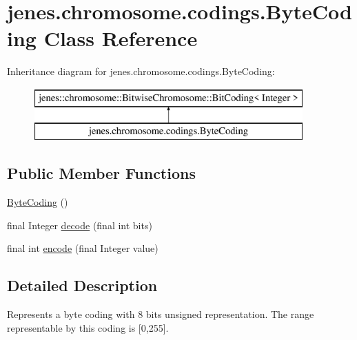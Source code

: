 \hypertarget{classjenes_1_1chromosome_1_1codings_1_1_byte_coding}{\section{jenes.\-chromosome.\-codings.\-Byte\-Coding Class Reference}
\label{classjenes_1_1chromosome_1_1codings_1_1_byte_coding}
}
Inheritance diagram for jenes.\-chromosome.\-codings.\-Byte\-Coding\-:\begin{figure}[H]
\begin{center}
\leavevmode
\includegraphics[height=2.000000cm]{classjenes_1_1chromosome_1_1codings_1_1_byte_coding}
\end{center}
\end{figure}
\subsection*{Public Member Functions}
\begin{DoxyCompactItemize}
\item 
\hyperlink{classjenes_1_1chromosome_1_1codings_1_1_byte_coding_ae5e1d99eebeb9d81d5185808e319dc8a}{Byte\-Coding} ()
\item 
final Integer \hyperlink{classjenes_1_1chromosome_1_1codings_1_1_byte_coding_a9cc6cb469c2fd907f50d9604fe6cb0fa}{decode} (final int bits)
\item 
final int \hyperlink{classjenes_1_1chromosome_1_1codings_1_1_byte_coding_a1b6e6c0f7996c3d497b257c7417cc28d}{encode} (final Integer value)
\end{DoxyCompactItemize}


\subsection{Detailed Description}
Represents a byte coding with 8 bits unsigned representation. The range representable by this coding is \mbox{[}0,255\mbox{]}.

